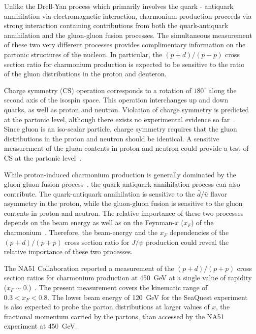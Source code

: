 \documentclass[reprint,aps,unsortedaddress,superscriptaddress,prl,floatfix,showpacs,linenumbers]{revtex4-2}
\begin{document}
Unlike the Drell-Yan process which primarily involves the
quark - antiquark annihilation via electromagnetic interaction, charmonium
production proceeds via strong interaction containing contributions from
both the quark-antiquark annihilation and the gluon-gluon
fusion processes. The simultaneous measurement of these two very different
processes provides complimentary
information on the partonic structures of the nucleon. In particular,
the $(p+d) / (p+p)$ cross section ratio for charmonium production is expected
to be sensitive to the ratio of the gluon distributions in the proton
and deuteron.

Charge symmetry (CS) operation corresponds to
a rotation of $180^\circ$ along the second axis of the
isospin space. This operation interchanges up and down quarks, as well
as proton and neutron.
Violation of charge symmetry is predicted at the
partonic level, although there exists no experimental evidence
so far~\cite{londergan2010}. Since gluon is an iso-scalar particle, charge symmetry
requires that the gluon distributions in the proton and neutron
should be identical. A sensitive measurement of the
gluon contents in proton and neutron could provide a test of CS at
the partonic level~\cite{piller1996,zhu2008,lansberg2012}.

While proton-induced charmonium production is generally dominated
by the gluon-gluon fusion process~\cite{vogt1999}, the
quark-antiquark annihilation process can also contribute.
The quark-antiquark annihilation is sensitive to the
$\bar{d} / \bar{u}$ flavor asymmetry in the proton, while the
gluon-gluon fusion is sensitive to the gluon contents in proton and
neutron. The relative importance of these two
processes depends on the beam energy as well as on the
Feynman-$x$ ($x_F$) of the charmonium~\cite{peng1995}. Therefore, the
beam-energy and the $x_F$ dependencies
of the $(p+d) / (p+p)$ cross section ratio for $J/\psi$ production
could reveal the relative importance of these two processes.

The NA51 Collaboration reported a measurement of the $(p+d) / (p+p)$ cross
section ratios for charmonium production at \SI{450}{\GeV} at a single value of
rapidity ($x_F \sim 0.$)~\cite{abreu1998}. The present measurement covers the
kinematic range of $0.3 < x_F < 0.8$. The lower beam energy of \SI{120}{\GeV}
for the SeaQuest experiment is also expected to probe
the parton distributions at larger values of $x$, the fractional momentum
carried by the partons, than accessed by the NA51 experiment at \SI{450}{\GeV}.
\end{document}
